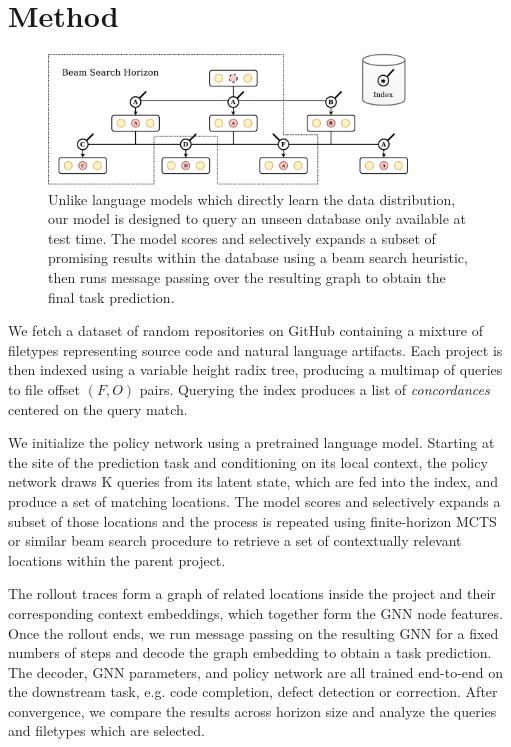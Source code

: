 \documentclass[11pt]{article}
\begin{document}
\section{Method}


\begin{figure}
  \centering
  \includegraphics[width=0.85\textwidth]{architecture}
  \caption{Unlike language models which directly learn the data distribution, our model is designed to query an unseen database only available at test time. The model scores and selectively expands a subset of promising results within the database using a beam search heuristic, then runs message passing over the resulting graph to obtain the final task prediction.}
\end{figure}

We fetch a dataset of random repositories on GitHub containing a mixture of filetypes representing source code and natural language artifacts. Each project is then indexed using a variable height radix tree, producing a multimap of queries to file offset $(F, O)$ pairs. Querying the index produces a list of \textit{concordances} centered on the query match.

 We initialize the policy network using a pretrained language model. Starting at the site of the prediction task and conditioning on its local context, the policy network draws K queries from its latent state, which are fed into the index, and produce a set of matching locations. The model scores and selectively expands a subset of those locations and the process is repeated using finite-horizon MCTS or similar beam search procedure to retrieve a set of contextually relevant locations within the parent project.

The rollout traces form a graph of related locations inside the project and their corresponding context embeddings, which together form the GNN node features. Once the rollout ends, we run message passing on the resulting GNN for a fixed numbers of steps and decode the graph embedding to obtain a task prediction. The decoder, GNN parameters, and policy network are all trained end-to-end on the downstream task, e.g. code completion, defect detection or correction. After convergence, we compare the results across horizon size and analyze the queries and filetypes which are selected.
\end{document}
